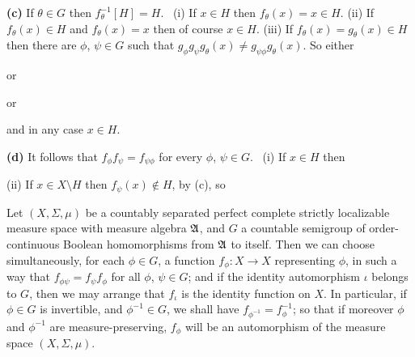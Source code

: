 {{\bf (c)} If $\theta\in G$ then $f_{\theta}^{-1}[H]=H$.   \Prf\ (i) If
$x\in
H$ then $f_{\theta}(x)=x\in H$.   (ii) If $f_{\theta}(x)\in H$ and
$f_{\theta}(x)=x$ then of course $x\in H$.   (iii) If
$f_{\theta}(x)=g_{\theta}(x)\in H$ then there are $\phi$, $\psi\in
G$ such that $g_{\phi}g_{\psi}g_{\theta}(x)\ne
g_{\psi\phi}g_{\theta}(x)$.   So either


\noindent or


\noindent or


\noindent and in any case $x\in H$.\ \Qed

\medskip

{\bf (d)} It follows that $f_{\phi}f_{\psi}=f_{\psi\phi}$ for every
$\phi$, $\psi\in G$.   \Prf\ (i) If $x\in H$ then


\noindent (ii) If $x\in X\setminus H$ then $f_{\psi}(x)\notin H$, by
(c), so

}%

 Let $(X,\Sigma,\mu)$ be a countably
separated perfect complete strictly localizable measure space with
measure algebra $\frak A$, and $G$ a countable semigroup of
order-continuous Boolean homomorphisms from $\frak A$ to itself.  Then
we can choose simultaneously, for each $\phi\in G$, a function
$f_{\phi}:X\to X$ representing
$\phi$, in such a way that $f_{\phi\psi}=f_{\psi}f_{\phi}$ for all
$\phi$, $\psi\in G$;  and if the identity automorphism $\iota$ belongs
to $G$, then we may arrange that $f_{\iota}$ is the identity function on
$X$.   In particular, if $\phi\in G$ is invertible, and
$\phi^{-1}\in G$, we shall have $f_{\phi^{-1}}=f_{\phi}^{-1}$;  so that
if moreover
$\phi$ and $\phi^{-1}$ are measure-preserving, $f_{\phi}$ will be an
automorphism of the measure space $(X,\Sigma,\mu)$.



